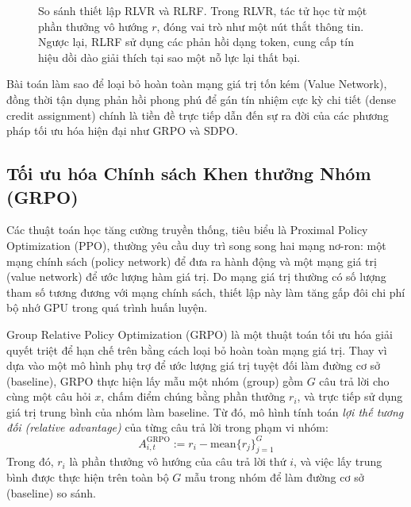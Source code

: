 \documentclass[12pt,a4paper]{report}
\begin{document}
\begin{figure}[h!]
    \vspace{0.3cm}
    \caption{So sánh thiết lập RLVR và RLRF. Trong RLVR, tác tử học từ một phần thưởng vô hướng $r$, đóng vai trò như một nút thắt thông tin. Ngược lại, RLRF sử dụng các phản hồi dạng token, cung cấp tín hiệu dồi dào giải thích tại sao một nỗ lực lại thất bại.}
    \label{fig:rlvr_vs_rlrf}
\end{figure}

Bài toán làm sao để loại bỏ hoàn toàn mạng giá trị tốn kém (Value Network), đồng thời tận dụng phản hồi phong phú để gán tín nhiệm cực kỳ chi tiết (dense credit assignment) chính là tiền đề trực tiếp dẫn đến sự ra đời của các phương pháp tối ưu hóa hiện đại như GRPO và SDPO.

\subsection{Tối ưu hóa Chính sách Khen thưởng Nhóm (GRPO)}
Các thuật toán học tăng cường truyền thống, tiêu biểu là Proximal Policy Optimization (PPO), thường yêu cầu duy trì song song hai mạng nơ-ron: một mạng chính sách (policy network) để đưa ra hành động và một mạng giá trị (value network) để ước lượng hàm giá trị. Do mạng giá trị thường có số lượng tham số tương đương với mạng chính sách, thiết lập này làm tăng gấp đôi chi phí bộ nhớ GPU trong quá trình huấn luyện. 

Group Relative Policy Optimization (GRPO) là một thuật toán tối ưu hóa giải quyết triệt để hạn chế trên bằng cách loại bỏ hoàn toàn mạng giá trị. Thay vì dựa vào một mô hình phụ trợ để ước lượng giá trị tuyệt đối làm đường cơ sở (baseline), GRPO thực hiện lấy mẫu một nhóm (group) gồm $G$ câu trả lời cho cùng một câu hỏi $x$, chấm điểm chúng bằng phần thưởng $r_i$, và trực tiếp sử dụng giá trị trung bình của nhóm làm baseline. Từ đó, mô hình tính toán \textit{lợi thế tương đối (relative advantage)} của từng câu trả lời trong phạm vi nhóm:
\begin{equation}
    A_{i,t}^{\text{GRPO}} := r_i - \text{mean}\{r_j\}_{j=1}^G
\end{equation}
Trong đó, $r_i$ là phần thưởng vô hướng của câu trả lời thứ $i$, và việc lấy trung bình được thực hiện trên toàn bộ $G$ mẫu trong nhóm để làm đường cơ sở (baseline) so sánh.
\end{document}
